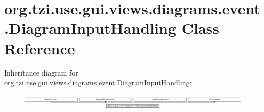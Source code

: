 \hypertarget{classorg_1_1tzi_1_1use_1_1gui_1_1views_1_1diagrams_1_1event_1_1_diagram_input_handling}{\section{org.\-tzi.\-use.\-gui.\-views.\-diagrams.\-event.\-Diagram\-Input\-Handling Class Reference}
\label{classorg_1_1tzi_1_1use_1_1gui_1_1views_1_1diagrams_1_1event_1_1_diagram_input_handling}
}
Inheritance diagram for org.\-tzi.\-use.\-gui.\-views.\-diagrams.\-event.\-Diagram\-Input\-Handling\-:\begin{figure}[H]
\begin{center}
\leavevmode
\includegraphics[height=0.790960cm]{classorg_1_1tzi_1_1use_1_1gui_1_1views_1_1diagrams_1_1event_1_1_diagram_input_handling}
\end{center}
\end{figure}
